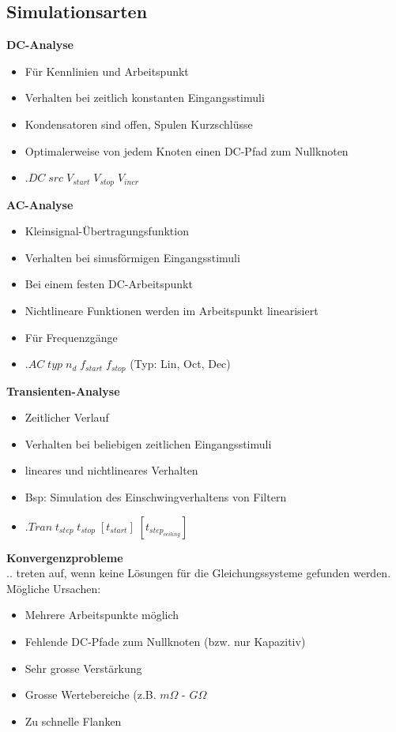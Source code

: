 	\subsection{Simulationsarten}
	\begin{multicols}{2}
			{\bf DC-Analyse}
			\begin{itemize}
				\item Für Kennlinien und Arbeitspunkt
				\item Verhalten bei zeitlich konstanten Eingangsstimuli
				\item Kondensatoren sind offen, Spulen Kurzschlüsse
				\item Optimalerweise von jedem Knoten einen DC-Pfad zum Nullknoten
				\item $.DC \; src \; V_{start} \; V_{stop} \; V_{incr}$
			\end{itemize}
			{\bf AC-Analyse}
			\begin{itemize}
				\item Kleinsignal-Übertragungsfunktion
				\item Verhalten bei sinusförmigen Eingangsstimuli
				\item Bei einem festen DC-Arbeitspunkt
				\item Nichtlineare Funktionen werden im Arbeitspunkt linearisiert
				\item Für Frequenzgänge
				\item $.AC \; typ \; n_d \; f_{start} \; f_{stop}$ (Typ: Lin, Oct, Dec)
			\end{itemize}
	\columnbreak
			{\bf Transienten-Analyse}
			\begin{itemize}
				\item Zeitlicher Verlauf
				\item Verhalten bei beliebigen zeitlichen Eingangsstimuli
				\item lineares und nichtlineares Verhalten
				\item Bsp: Simulation des Einschwingverhaltens von Filtern
				\item $.Tran \; t_{step} \; t_{stop} \; [t_{start}] \; [t_{step_{ceiling}}]$
			\end{itemize}
			{\bf Konvergenzprobleme} \\
			.. treten auf, wenn keine Lösungen für die Gleichungssysteme gefunden werden.\\
			Mögliche Ursachen: \\
			\begin{itemize}
				\item Mehrere Arbeitspunkte möglich
				\item Fehlende DC-Pfade zum Nullknoten (bzw. nur Kapazitiv)
				\item Sehr grosse Verstärkung
				\item Grosse Wertebereiche (z.B. $m \Omega$ - $G \Omega$
				\item Zu schnelle Flanken
			\end{itemize}
	\end{multicols}